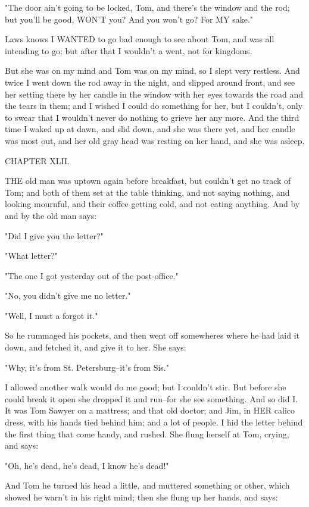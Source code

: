 "The door ain't going to be locked, Tom, and there's the window and the
rod; but you'll be good, WON'T you?  And you won't go?  For MY sake."

Laws knows I WANTED to go bad enough to see about Tom, and was all
intending to go; but after that I wouldn't a went, not for kingdoms.

But she was on my mind and Tom was on my mind, so I slept very restless.
And twice I went down the rod away in the night, and slipped around
front, and see her setting there by her candle in the window with her
eyes towards the road and the tears in them; and I wished I could do
something for her, but I couldn't, only to swear that I wouldn't never do
nothing to grieve her any more.  And the third time I waked up at dawn,
and slid down, and she was there yet, and her candle was most out, and
her old gray head was resting on her hand, and she was asleep.




CHAPTER XLII.

THE old man was uptown again before breakfast, but couldn't get no track
of Tom; and both of them set at the table thinking, and not saying
nothing, and looking mournful, and their coffee getting cold, and not
eating anything. And by and by the old man says:

"Did I give you the letter?"

"What letter?"

"The one I got yesterday out of the post-office."

"No, you didn't give me no letter."

"Well, I must a forgot it."

So he rummaged his pockets, and then went off somewheres where he had
laid it down, and fetched it, and give it to her.  She says:

"Why, it's from St. Petersburg--it's from Sis."

I allowed another walk would do me good; but I couldn't stir.  But before
she could break it open she dropped it and run--for she see something.
And so did I. It was Tom Sawyer on a mattress; and that old doctor; and
Jim, in HER calico dress, with his hands tied behind him; and a lot of
people.  I hid the letter behind the first thing that come handy, and
rushed.  She flung herself at Tom, crying, and says:

"Oh, he's dead, he's dead, I know he's dead!"

And Tom he turned his head a little, and muttered something or other,
which showed he warn't in his right mind; then she flung up her hands,
and says:

